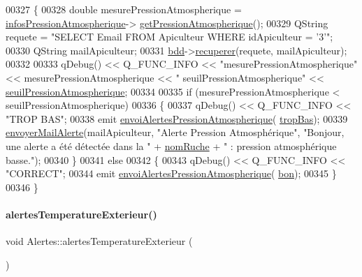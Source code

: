 \begin{DoxyCode}
00327 \{
00328     \textcolor{keywordtype}{double} mesurePressionAtmospherique = \hyperlink{class_alertes_af4bfb245d72bc2eb080df844aa50ac86}{infosPressionAtmospherique}->
      \hyperlink{class_infos_pression_atmospherique_ace9906ecdd245d4d443554fcc77c76a5}{getPressionAtmospherique}();
00329     QString requete = \textcolor{stringliteral}{"SELECT Email FROM Apiculteur WHERE idApiculteur = '3'"};
00330     QString mailApiculteur;
00331     \hyperlink{class_alertes_a91e58b69d29922e8e984efb767ae5268}{bdd}->\hyperlink{class_base_de_donnees_a77539baad389f5acf754cd2cd452403e}{recuperer}(requete, mailApiculteur);
00332 
00333     qDebug() << Q\_FUNC\_INFO << \textcolor{stringliteral}{"mesurePressionAtmospherique"} << mesurePressionAtmospherique << \textcolor{stringliteral}{"
      seuilPressionAtmospherique"} << \hyperlink{class_alertes_a565094789ef5eb0ae2a2a562ee8a9704}{seuilPressionAtmospherique};
00334 
00335     \textcolor{keywordflow}{if} (mesurePressionAtmospherique < seuilPressionAtmospherique)
00336     \{
00337         qDebug() << Q\_FUNC\_INFO << \textcolor{stringliteral}{"TROP BAS"};
00338         emit \hyperlink{class_alertes_a3e81bcca9d4c91c69f575546681590bc}{envoiAlertesPressionAtmospherique}(
      \hyperlink{parametres_8h_aaa6de8207c94675264c90b10b613368da4257e2f8921856770c8266f55c937295}{tropBas});
00339         \hyperlink{class_alertes_a375783502a78109f3323dc1ed90cfdc9}{envoyerMailAlerte}(mailApiculteur, \textcolor{stringliteral}{"Alerte Pression Atmosphérique"}, \textcolor{stringliteral}{"Bonjour, une
       alerte a été détectée dans la "}  + \hyperlink{class_alertes_a212f2a7185bcc7b11f3e54200272bdcf}{nomRuche} +  \textcolor{stringliteral}{" : pression atmosphérique basse."});
00340     \}
00341     \textcolor{keywordflow}{else}
00342     \{
00343         qDebug() << Q\_FUNC\_INFO << \textcolor{stringliteral}{"CORRECT"};
00344         emit \hyperlink{class_alertes_a3e81bcca9d4c91c69f575546681590bc}{envoiAlertesPressionAtmospherique}(
      \hyperlink{parametres_8h_aaa6de8207c94675264c90b10b613368da5ac8ec3b54d90a07c6bb5a77ef971821}{bon});
00345     \}
00346 \}
\end{DoxyCode}
\mbox{\label{class_alertes_a91fb2665fa8b6c32c74bfe4d1b89a2d8}} 
\paragraph{\texorpdfstring{alertes\+Temperature\+Exterieur()}{alertesTemperatureExterieur()}}
{\footnotesize\ttfamily void Alertes\+::alertes\+Temperature\+Exterieur (\begin{DoxyParamCaption}{ }\end{DoxyParamCaption})}

